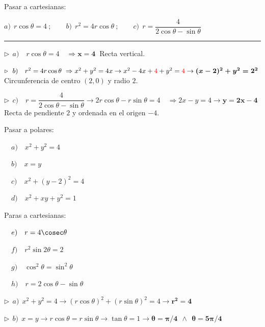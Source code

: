 \vspace{5mm}
\begin{miejercicio} 
	

 Pasar a cartesianas: 

\hspace{2.6cm} $a) \ \  r\cos \theta =4 \ ; \qquad b)\ \   r^2=4r\cos \theta\ ; \qquad c)\ \   r=\dfrac 4{2\cos \theta - \sin \theta}$

 \rule{300pt}{0.2pt}

$\triangleright \ \ a)\quad  r\cos \theta = 4 \quad \Rightarrow  \boldsymbol{x=4}\ $ Recta vertical.

$\triangleright \ \ b)\quad   r^2=4r\cos \theta\ \Rightarrow x^2+y^2=4 x \to x^2-4x+\textcolor{red}{4} + y^2= \textcolor{red}{4} \to \boldsymbol{(x-2)^2+y^2=2^2} \ $ 
Circunferencia de centro $(2,0)$ y radio $2$.

$\triangleright \ \ c)\quad  r=\dfrac 4{2\cos \theta - \sin \theta} \to 2r\cos \theta -r\sin \theta = 4 \quad \Rightarrow  2x-y=4 \to \boldsymbol{y=2x-4} \ $ Recta de pendiente $2$ y ordenada en el origen $-4$.
\end{miejercicio}


\vspace{5mm}
\begin{mipropuesto} 

\begin{multicols}{2}
Pasar a polares:

$\quad a)\quad x^2+y^2=4$

$\quad b)\quad x=y$

$\quad c)\quad x^2+(y-2)^2=4$	

$\quad d)\quad x^2+xy+y^2=1$

Paras a cartesianas:

$\quad e)\quad r=4\cosec \theta$

$\quad f)\quad r^2\sin 2\theta=2$

$\quad g)\quad \cos^2 \theta = \sin^2 \theta$

$\quad h)\quad r=2\cos \theta-\sin \theta$
\end{multicols}
	
\end{mipropuesto}

$\triangleright \ \ a)\ \ x^2+y^2=4 \to (r\cos \theta)^2+(r\sin \theta)^2=4 \to \boldsymbol{r^2=4}$

$\triangleright \ \ b)\ \ x=y \to r\cos \theta=r\sin \theta \to \tan \theta=1 \to \boldsymbol{\theta =\pi/4 \ \ \wedge \ \ \theta = 5\pi/4}$

